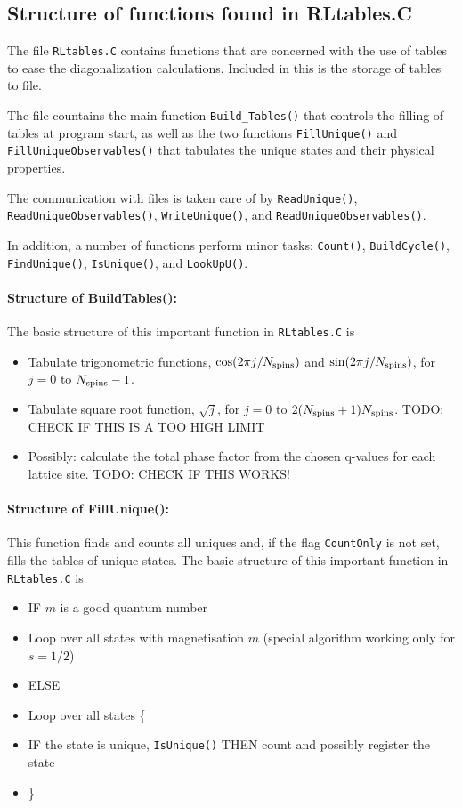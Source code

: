 \documentclass{article}
\begin{document}
\subsection{Structure of functions found in RLtables.C}
The file \verb+RLtables.C+ contains functions that are concerned with the use of tables to ease the diagonalization calculations. 
Included in this is the storage of tables to file.

The file countains the main function \verb+Build_Tables()+ that controls the filling of tables at program start, as well as the two functions \verb+FillUnique()+ and \verb+FillUniqueObservables()+ that tabulates the unique states and their physical properties.

The communication with files is taken care of by \verb+ReadUnique()+, \verb+ReadUniqueObservables()+, \verb+WriteUnique()+, and \verb+ReadUniqueObservables()+.

In addition, a number of functions perform minor tasks: \verb+Count()+, \verb+BuildCycle()+, \verb+FindUnique()+, \verb+IsUnique()+, and \verb+LookUpU()+.

\paragraph{Structure of BuildTables():} The basic structure of this important function in \verb+RLtables.C+ is
\begin{itemize}
\item Tabulate trigonometric functions, $\cos(2\pi j / N_{\rm spins})$ and $\sin(2\pi j / N_{\rm spins})$, 
for $j=0$ to $N_{\rm spins}-1$.
\item Tabulate square root function, $\sqrt{j}$, for $j=0$ to $2(N_{\rm spins}+1)N_{\rm spins}$. TODO: CHECK IF THIS IS A TOO HIGH LIMIT
\item Possibly: calculate the total phase factor from the chosen q-values for each lattice site. TODO: CHECK IF THIS WORKS!  
\end{itemize}

\paragraph{Structure of FillUnique():} This function finds and counts all uniques and, if the flag \verb+CountOnly+ is not set, fills the tables of unique states. The basic structure of this important function in \verb+RLtables.C+ is
\begin{itemize}
\item IF $m$ is a good quantum number
\item \hspace{5mm} Loop over all states with magnetisation $m$ (special algorithm working only for $s=1/2$)
\item ELSE
\item \hspace{5mm} Loop over all states \{
\item \hspace{10mm} IF the state is unique, \verb+IsUnique()+ THEN count and possibly register the state
\item \hspace{5mm} \}
\end{itemize}
\end{document}
